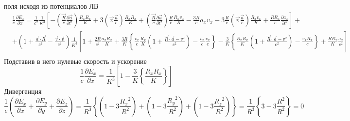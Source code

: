 \documentclass[11pt]{article}
\makeatletter
\newcommand{\boxspacing}{\kern\kvtcb@left@rule\kern\kvtcb@boxsep}
\newcommand{\prompt}[4]{
        {\ttfamily\llap{{\color{#2}[#3]:\hspace{3pt}#4}}\vspace{-\baselineskip}}
    }
\makeatother
\begin{document}
поля исходя из потенциалов ЛВ \[\begin{align}
  & \frac{1}{e}\frac{\partial {{E}_{x}}}{\partial x}=\frac{1}{{{c}^{2}}}\frac{1}{{{K}^{3}}}\left[ -\left( \frac{\overrightarrow{R}}{c}\frac{\partial \overrightarrow{a}}{\partial t'} \right)\frac{{{R}_{x}}{{R}_{x}}}{K}+3\left( \overrightarrow{v}\frac{\overrightarrow{a}}{c} \right)\frac{{{R}_{x}}{{R}_{x}}}{K}+\left( \frac{\overrightarrow{R}}{c}\frac{\partial \overrightarrow{a}}{\partial t'} \right)\frac{R}{c}\frac{{{R}_{x}}{{v}_{x}}}{K}-\frac{3R}{c}{{a}_{x}}{{v}_{x}}-3\frac{R}{c}\left( \overrightarrow{v}\frac{\overrightarrow{a}}{c} \right)\frac{{{R}_{x}}{{v}_{x}}}{K}+\frac{R{{R}_{x}}}{c}\frac{\partial {{a}_{x}}}{\partial t'} \right]+ \\ 
 & +\left( 1+\frac{\overrightarrow{a}\cdot \overrightarrow{R}}{{{c}^{2}}}-\frac{\overrightarrow{v}\cdot \overrightarrow{v}}{{{c}^{2}}} \right)\frac{1}{{{K}^{3}}}\left[ 1+\frac{2R}{{{c}^{2}}}\frac{{{a}_{x}}{{R}_{x}}}{K}+\frac{3R}{K}\left\{ \frac{{{v}_{x}}}{c}\frac{{{R}_{x}}}{K}\left( 1+\frac{\overrightarrow{R}\cdot \overrightarrow{a}-{{v}^{2}}}{{{c}^{2}}} \right)-\frac{{{v}_{x}}}{c}\frac{{{v}_{x}}}{c} \right\}-\frac{3}{K}\left\{ \frac{{{R}_{x}}{{R}_{x}}}{K}\left( 1+\frac{\overrightarrow{R}\cdot \overrightarrow{a}-{{v}^{2}}}{{{c}^{2}}} \right)-\frac{{{v}_{x}}{{R}_{x}}}{c} \right\}+\frac{R{{R}_{x}}}{K}\frac{{{a}_{x}}}{{{c}^{2}}} \right] \\ 
\end{align}\] Подставив в него нулевые скорость и ускорение
\[\frac{1}{e}\frac{\partial {{E}_{x}}}{\partial x}=\frac{1}{{{K}^{3}}}\left[ 1-\frac{3}{K}\left\{ \frac{{{R}_{x}}{{R}_{x}}}{K} \right\} \right]\]
Дивергенция
\[\frac{1}{e}\left( \frac{\partial {{E}_{x}}}{\partial x}+\frac{\partial {{E}_{y}}}{\partial y}+\frac{\partial {{E}_{z}}}{\partial z} \right)=\frac{1}{{{R}^{3}}}\left\{ \left( 1-3\frac{{{R}_{x}}^{2}}{{{R}^{2}}} \right)+\left( 1-3\frac{{{R}_{y}}^{2}}{{{R}^{2}}} \right)+\left( 1-3\frac{{{R}_{z}}^{2}}{{{R}^{2}}} \right) \right\}=\frac{1}{{{R}^{3}}}\left\{ 3-3\frac{{{R}^{2}}}{{{R}^{2}}} \right\}=0\]

    \begin{tcolorbox}[breakable, size=fbox, boxrule=1pt, pad at break*=1mm,colback=cellbackground, colframe=cellborder]
\prompt{In}{incolor}{ }{\boxspacing}
\begin{Verbatim}[commandchars=\\\{\}]

\end{Verbatim}
\end{tcolorbox}


    
    
    
\end{document}
